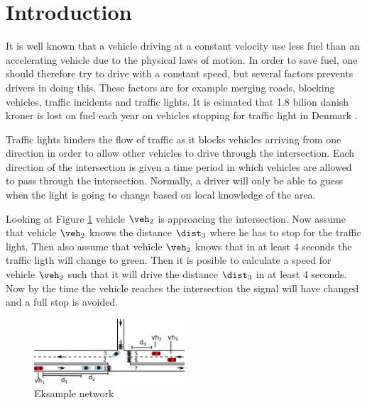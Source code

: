 \section{Introduction}

It is well known that a vehicle driving at a constant velocity use less fuel than an accelerating vehicle due to the physical laws of motion.\cite{Vejdir}
In order to save fuel, one should therefore try to drive with a constant speed, but several factors prevents drivers in doing this. 
These factors are for example merging roads, blocking vehicles, traffic incidents and traffic lights. 
It is esimated that 1.8 bilion danish kroner is lost on fuel each year on vehicles stopping for traffic light in Denmark \cite{Vejdir}.

Traffic lights hinders the flow of traffic as it blocks vehicles arriving from one direction in order to allow other vehicles to drive through the intersection.
Each direction of the intersection is given a time period in which vehicles are allowed to pass through the intersection. 
Normally, a driver will only be able to guess when the light is going to change based on local knowledge of the area. 

Looking at Figure \ref{fig:Introduction:network} vehicle $\veh_2$ is approacing the intersection.
Now assume that vehicle $\veh_2$ knows the distance $\dist_3$ where he has to stop for the traffic light. 
Then also assume that vehicle $\veh_2$ knows that in at least $4$ seconds the traffic ligth will change to green. 
Then it is posible to calculate a speed for vehicle $\veh_2$ such that it will drive the distance $\dist_3$ in at least $4$ seconds. 
Now by the time the vehicle reaches the intersection the signal will have changed and a full stop is avoided.
\begin{figure}[htb]
\centering
\includegraphics[width=0.5\textwidth]{images/introNetwork.png}
\caption{Eksample network}
\label{fig:Introduction:network}
\end{figure}

